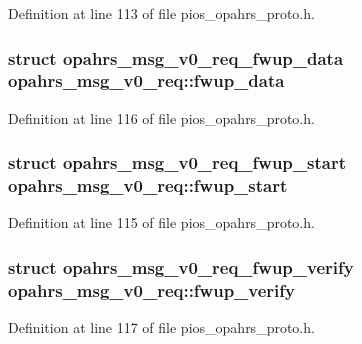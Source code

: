 Definition at line 113 of file pios\-\_\-opahrs\-\_\-proto.\-h.

\hypertarget{unionopahrs__msg__v0__req_a642fe114f1e4a4ff132f3b51c824a9c2}{
\subsubsection[{fwup\-\_\-data}]{\setlength{\rightskip}{0pt plus 5cm}struct {\bf opahrs\-\_\-msg\-\_\-v0\-\_\-req\-\_\-fwup\-\_\-data} opahrs\-\_\-msg\-\_\-v0\-\_\-req\-::fwup\-\_\-data}}\label{unionopahrs__msg__v0__req_a642fe114f1e4a4ff132f3b51c824a9c2}


Definition at line 116 of file pios\-\_\-opahrs\-\_\-proto.\-h.

\hypertarget{unionopahrs__msg__v0__req_a7eb2172f026850a2624a03821944a47f}{
\subsubsection[{fwup\-\_\-start}]{\setlength{\rightskip}{0pt plus 5cm}struct {\bf opahrs\-\_\-msg\-\_\-v0\-\_\-req\-\_\-fwup\-\_\-start} opahrs\-\_\-msg\-\_\-v0\-\_\-req\-::fwup\-\_\-start}}\label{unionopahrs__msg__v0__req_a7eb2172f026850a2624a03821944a47f}


Definition at line 115 of file pios\-\_\-opahrs\-\_\-proto.\-h.

\hypertarget{unionopahrs__msg__v0__req_a58e1c51c26b939de6eded87cdbb22ae6}{
\subsubsection[{fwup\-\_\-verify}]{\setlength{\rightskip}{0pt plus 5cm}struct {\bf opahrs\-\_\-msg\-\_\-v0\-\_\-req\-\_\-fwup\-\_\-verify} opahrs\-\_\-msg\-\_\-v0\-\_\-req\-::fwup\-\_\-verify}}\label{unionopahrs__msg__v0__req_a58e1c51c26b939de6eded87cdbb22ae6}


Definition at line 117 of file pios\-\_\-opahrs\-\_\-proto.\-h.

